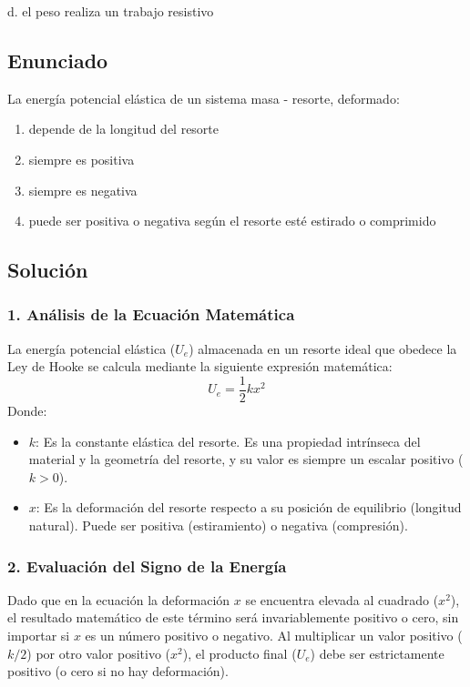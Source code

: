 \documentclass[12pt, a4paper]{article}
\begin{document}
\begin{tcolorbox}[colback=green!5!white, colframe=green!50!black, title=Respuesta Correcta]
\centering \Large d. el peso realiza un trabajo resistivo
\end{tcolorbox}

\newpage

\subsection*{Enunciado}
La energía potencial elástica de un sistema masa - resorte, deformado:
\begin{enumerate}[label=\alph*.]
    \item depende de la longitud del resorte
    \item siempre es positiva
    \item siempre es negativa
    \item puede ser positiva o negativa según el resorte esté estirado o comprimido
\end{enumerate}

\subsection*{Solución}

\subsubsection*{1. Análisis de la Ecuación Matemática}
La energía potencial elástica ($U_e$) almacenada en un resorte ideal que obedece la Ley de Hooke se calcula mediante la siguiente expresión matemática:
$$U_e = \frac{1}{2} k x^2$$
Donde:
\begin{itemize}
    \item $k$: Es la constante elástica del resorte. Es una propiedad intrínseca del material y la geometría del resorte, y su valor es siempre un escalar positivo ($k > 0$).
    \item $x$: Es la deformación del resorte respecto a su posición de equilibrio (longitud natural). Puede ser positiva (estiramiento) o negativa (compresión).
\end{itemize}

\subsubsection*{2. Evaluación del Signo de la Energía}
Dado que en la ecuación la deformación $x$ se encuentra elevada al cuadrado ($x^2$), el resultado matemático de este término será invariablemente positivo o cero, sin importar si $x$ es un número positivo o negativo. 
Al multiplicar un valor positivo ($k/2$) por otro valor positivo ($x^2$), el producto final ($U_e$) debe ser estrictamente positivo (o cero si no hay deformación). 
\end{document}

